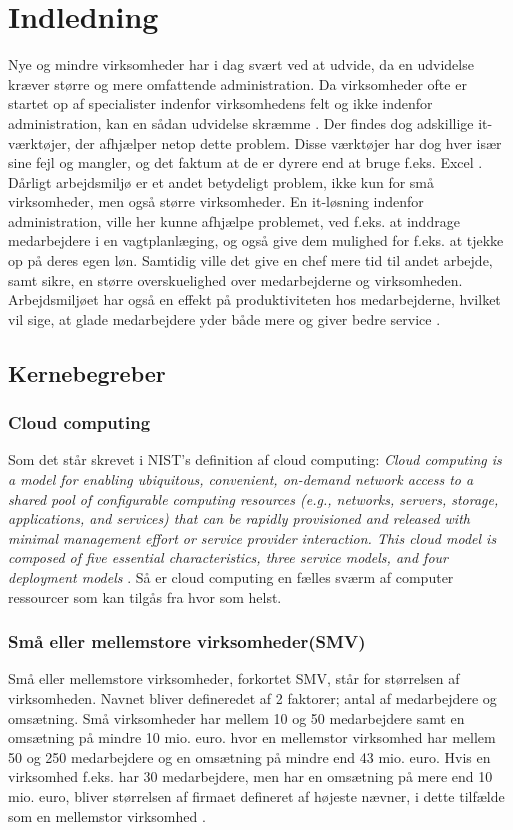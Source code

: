 \chapter{Indledning}
Nye og mindre virksomheder har i dag svært ved at udvide, da en udvidelse kræver større og mere omfattende administration. Da virksomheder ofte er startet op af specialister indenfor virksomhedens felt og ikke indenfor administration, kan en sådan udvidelse skræmme \citep{SmaaFirmaerOrker}. Der findes dog adskillige it-værktøjer, der afhjælper netop dette problem. Disse værktøjer har dog hver især sine fejl og mangler, og det faktum at de er dyrere end at bruge f.eks. Excel \citep{Play}.\\
Dårligt arbejdsmiljø er et andet betydeligt problem, ikke kun for små virksomheder, men også større virksomheder. En it-løsning indenfor administration, ville her kunne afhjælpe problemet, ved f.eks. at inddrage medarbejdere i en vagtplanlæging, og også give dem mulighed for f.eks. at tjekke op på deres egen løn. Samtidig ville det give en chef mere tid til andet arbejde, samt sikre, en større overskuelighed over medarbejderne og virksomheden. 
Arbejdsmiljøet har også en effekt på produktiviteten hos medarbejderne, hvilket vil sige, at glade medarbejdere yder både mere og giver bedre service \citep{Jensen2014}.

\section{Kernebegreber}
\subsection{Cloud computing}
Som det står skrevet i NIST’s definition af cloud computing: \textit{Cloud computing is a model for enabling ubiquitous, convenient, on-demand network access to a shared pool of configurable computing resources (e.g., networks, servers, storage, applications, and services) that can be rapidly provisioned and released with minimal management effort or service provider interaction. This cloud model is composed of five essential characteristics, three service models, and four deployment models} \citep{cloud_def}. Så er cloud computing en fælles sværm af computer ressourcer som kan tilgås fra hvor som helst.\\

\subsection{Små eller mellemstore virksomheder(SMV)}
Små eller mellemstore virksomheder, forkortet SMV, står for størrelsen af virksomheden. Navnet bliver defineredet af 2 faktorer; antal af medarbejdere og omsætning. Små virksomheder har mellem 10 og 50 medarbejdere samt en omsætning på mindre 10 mio. euro. hvor en mellemstor virksomhed har mellem 50 og 250 medarbejdere og en omsætning på mindre end 43 mio. euro. Hvis en virksomhed f.eks. har 30 medarbejdere, men har en omsætning på mere end 10 mio. euro, bliver størrelsen af firmaet defineret af højeste nævner, i dette tilfælde som en mellemstor virksomhed \citep{SMV}.

